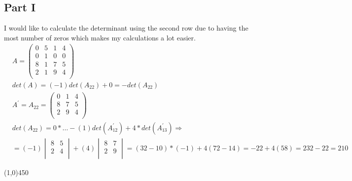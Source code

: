 \documentclass[a4paper,12pt]{article}
\begin{document}
\subsection{Part I}
\begin{doublespace}
I would like to calculate the determinant using the second row due to having the most number of zeros which makes my calculations a lot easier.
	\begin{align*}
		&A = \begin{pmatrix} 0 & 5 & 1 & 4\\ 0 & 1 & 0 & 0\\ 8 & 1 & 7 & 5\\ 2 & 1 & 9 & 4\\ \end{pmatrix}\\
		& det(A) = (-1) det(A_{22}) + 0 = -det(A_{22}) \\
		& A^\prime = A_{22} = \begin{pmatrix} 0 & 1 & 4\\ 8  & 7 & 5\\ 2 & 9 & 4\\ \end{pmatrix} \\
		&det(A_{22}) = 0 * \dots -(1) det(A^\prime_{12}) + 4*det(A^\prime_{13}) \Rightarrow \\
		& = (-1)\begin{vmatrix}
			8 & 5  \\ 
			2 & 4 \\ 
			\end{vmatrix}  
		+ 
		(4)\begin{vmatrix}
			8 & 7 \\ 
			2 & 9  \\ 
			\end{vmatrix}  
		= (32 - 10 ) * (-1) + 4(72-14) = -22 + 4(58) = 232 - 22 = 210 
	\end{align*}
\end{doublespace}
\line(1,0){450}
\end{document}
